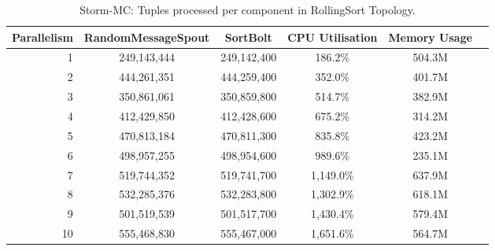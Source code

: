 \begin{table}[!htb]
\begin{adjustwidth}{-0.5in}{-0.5in}
\centering
\small
\begin{tabular}{@{}rccccl@{}}
    {Parallelism} & {RandomMessageSpout} & {SortBolt} & {CPU Utilisation} & {Memory Usage} \\ \toprule
    1 & {249,143,444} & {249,142,400} & {186.2\%} & {504.3M} \\
    2 & {444,261,351} & {444,259,400} & {352.0\%} & {401.7M} \\
    3 & {350,861,061} & {350,859,800} & {514.7\%} & {382.9M} \\
    4 & {412,429,850} & {412,428,600} & {675.2\%} & {314.2M} \\
    5 & {470,813,184} & {470,811,300} & {835.8\%} & {423.2M} \\
    6 & {498,957,255} & {498,954,600} & {989.6\%} & {235.1M} \\
    7 & {519,744,352} & {519,741,700} & {1,149.0\%} & {637.9M} \\
    8 & {532,285,376} & {532,283,800} & {1,302.9\%} & {618.1M} \\
    9 & {501,519,539} & {501,517,700} & {1,430.4\%} & {579.4M} \\
    10 & {555,468,830} & {555,467,000} & {1,651.6\%} & {564.7M} \\ 
\end{tabular}
\caption{Storm-MC: Tuples processed per component in RollingSort Topology.}
\label{table:storm_mc_rolling}
\end{adjustwidth}
\end{table}

